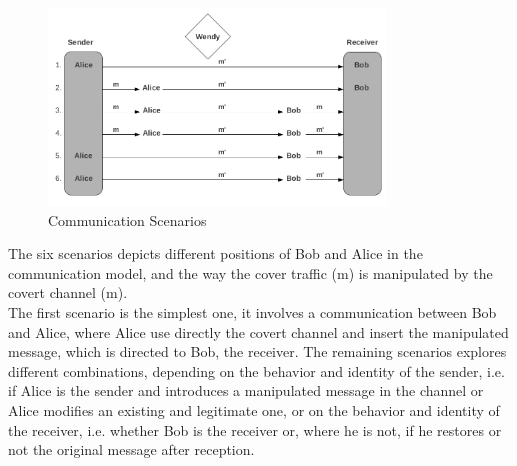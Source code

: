\documentclass[12pt]{article}
\begin{document}
\begin{figure} [ht] %
\begin{center}
\includegraphics[width=0.8\textwidth]{communicationScenarios}
\caption{Communication Scenarios}
\label{fig:commScenarios}
\end{center}
\end{figure}

The six scenarios depicts different positions of Bob and Alice in the communication model, and the way the cover traffic (m) is manipulated by the covert channel (m\textprime).\\
The first scenario is the simplest one, it 
involves a communication between Bob and Alice, where Alice use directly the covert channel and insert the manipulated message, which is directed to Bob, the receiver. The remaining scenarios explores different 
combinations, depending on the behavior and identity of the sender, i.e. if Alice is the sender and introduces a manipulated message in the channel or Alice modifies an existing and legitimate one, or on the behavior and 
identity of the receiver, i.e. whether Bob is the receiver or, where he is not, if he restores or not the original message after reception.\\
\end{document}
